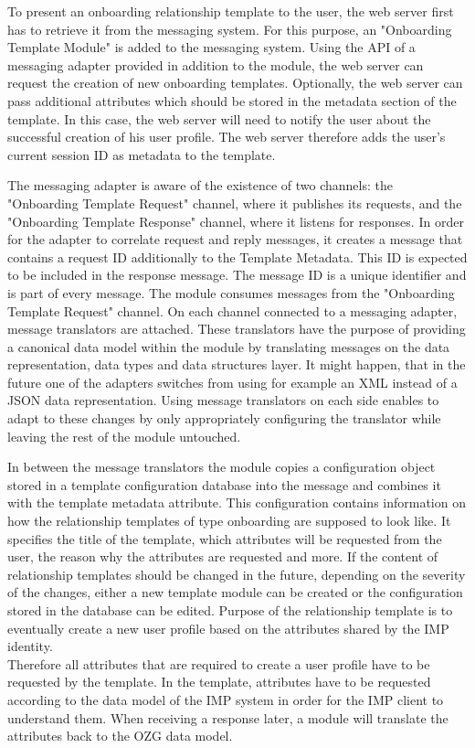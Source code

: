 To present an onboarding relationship template to the user, the web server first has to retrieve it from the messaging system. For this purpose, an "Onboarding Template Module" is added to the messaging system. Using the API of a messaging adapter provided in addition to the module, the web server can request the creation of new onboarding templates. Optionally, the web server can pass additional attributes which should be stored in the metadata section of the template. In this case, the web server will need to notify the user about the successful creation of his user profile. The web server therefore adds the user's current session ID as metadata to the template.

The messaging adapter is aware of the existence of two channels: the "Onboarding Template Request" channel, where it publishes its requests, and the "Onboarding Template Response" channel, where it listens for responses. In order for the adapter to correlate request and reply messages, it creates a message that contains a request ID additionally to the Template Metadata. This ID is expected to be included in the response message. The message ID is a unique identifier and is part of every message. The module consumes messages from the "Onboarding Template Request" channel. On each channel connected to a messaging adapter, message translators are attached. These translators have the purpose of providing a canonical data model within the module by translating messages on the data representation, data types and data structures layer. It might happen, that in the future one of the adapters switches from using for example an XML instead of a JSON data representation. Using message translators on each side enables to adapt to these changes by only appropriately configuring the translator while leaving the rest of the module untouched.

In between the message translators the module copies a configuration object stored in a template configuration database into the message and combines it with the template metadata attribute. This configuration contains information on how the relationship templates of type onboarding are supposed to look like. It specifies the title of the template, which attributes will be requested from the user, the reason why the attributes are requested and more. If the content of relationship templates should be changed in the future, depending on the severity of the changes, either a new template module can be created or the configuration stored in the database can be edited. Purpose of the relationship template is to eventually create a new user profile based on the attributes shared by the IMP identity. \\ 
Therefore all attributes that are required to create a user profile have to be requested by the template. In the template, attributes have to be requested according to the data model of the IMP system in order for the IMP client to understand them. When receiving a response later, a module will translate the attributes back to the OZG data model.

